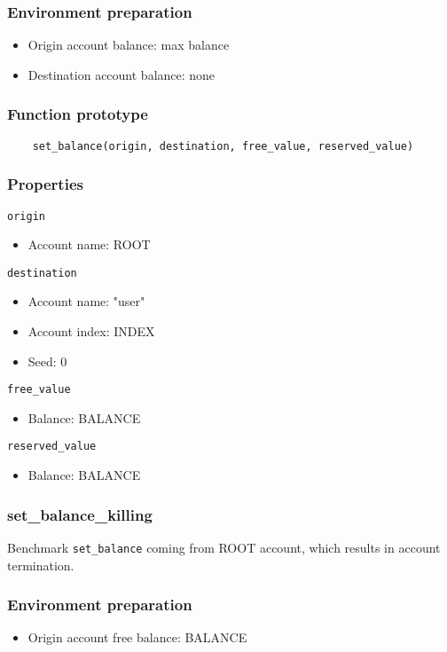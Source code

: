 \documentclass[11pt,a4paper]{article}
\begin{document}
\subsubsection*{Environment preparation}
\begin{itemize}
\item Origin account balance: max balance
\item Destination account balance: none
\end{itemize}

\subsubsection*{Function prototype}
\begin{verbatim}
    set_balance(origin, destination, free_value, reserved_value)
\end{verbatim}

\subsubsection*{Properties}
\verb|origin|
\begin{itemize}
\item Account name: ROOT
\end{itemize}
\verb|destination|
\begin{itemize}
\item Account name: "user"
\item Account index: INDEX
\item Seed: 0
\end{itemize}
\verb|free_value|
\begin{itemize}
\item Balance: BALANCE
\end{itemize}
\verb|reserved_value|
\begin{itemize}
\item Balance: BALANCE
\end{itemize}

\subsubsection{set\_balance\_killing}

Benchmark \verb|set_balance| coming from ROOT account, which results in account termination.

\subsubsection*{Environment preparation}
\begin{itemize}
    \item Origin account free balance: BALANCE
\end{itemize}
\end{document}
